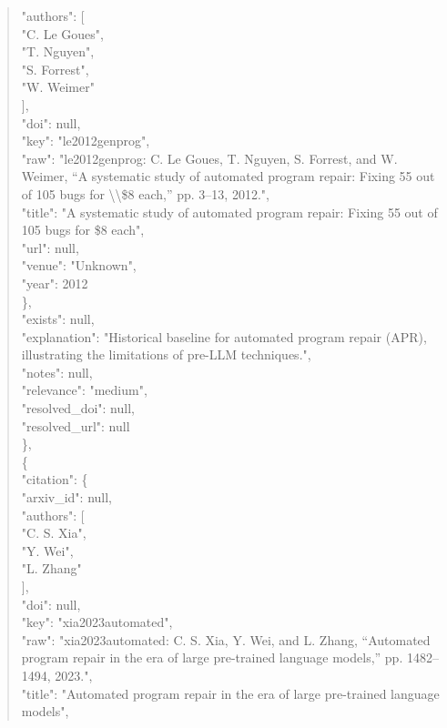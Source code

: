 \documentclass[11pt]{article}
\begin{document}
\begin{quote}
        "authors": [\\
          "C. Le Goues",\\
          "T. Nguyen",\\
          "S. Forrest",\\
          "W. Weimer"\\
        ],\\
        "doi": null,\\
        "key": "le2012genprog",\\
        "raw": "le2012genprog: C. Le Goues, T. Nguyen, S. Forrest, and W. Weimer, ``A systematic study of automated program repair: Fixing 55 out of 105 bugs for \textbackslash{}\textbackslash{}\$8 each,'' pp. 3--13, 2012.",\\
        "title": "A systematic study of automated program repair: Fixing 55 out of 105 bugs for \$8 each",\\
        "url": null,\\
        "venue": "Unknown",\\
        "year": 2012\\
      \},\\
      "exists": null,\\
      "explanation": "Historical baseline for automated program repair (APR), illustrating the limitations of pre-LLM techniques.",\\
      "notes": null,\\
      "relevance": "medium",\\
      "resolved\_doi": null,\\
      "resolved\_url": null\\
    \},\\
    \{\\
      "citation": \{\\
        "arxiv\_id": null,\\
        "authors": [\\
          "C. S. Xia",\\
          "Y. Wei",\\
          "L. Zhang"\\
        ],\\
        "doi": null,\\
        "key": "xia2023automated",\\
        "raw": "xia2023automated: C. S. Xia, Y. Wei, and L. Zhang, ``Automated program repair in the era of large pre-trained language models,'' pp. 1482--1494, 2023.",\\
        "title": "Automated program repair in the era of large pre-trained language models",\\

\end{quote}
\end{document}
